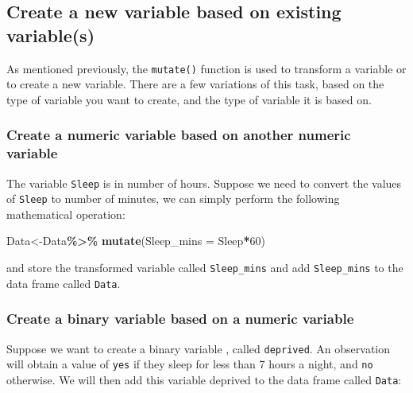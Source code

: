 \documentclass[
]{book}
\newenvironment{Shaded}{\begin{snugshade}}{\end{snugshade}}
\newcommand{\AttributeTok}[1]{\textcolor[rgb]{0.13,0.29,0.53}{#1}}
\newcommand{\DecValTok}[1]{\textcolor[rgb]{0.00,0.00,0.81}{#1}}
\newcommand{\FunctionTok}[1]{\textcolor[rgb]{0.13,0.29,0.53}{\textbf{#1}}}
\newcommand{\NormalTok}[1]{#1}
\newcommand{\OtherTok}[1]{\textcolor[rgb]{0.56,0.35,0.01}{#1}}
\newcommand{\SpecialCharTok}[1]{\textcolor[rgb]{0.81,0.36,0.00}{\textbf{#1}}}
\begin{document}
\hypertarget{create-a-new-variable-based-on-existing-variables-1}{%
\subsection{Create a new variable based on existing variable(s)}\label{create-a-new-variable-based-on-existing-variables-1}}

As mentioned previously, the \texttt{mutate()} function is used to transform a variable or to create a new variable. There are a few variations of this task, based on the type of variable you want to create, and the type of variable it is based on.

\hypertarget{create-a-numeric-variable-based-on-another-numeric-variable-1}{%
\subsubsection{Create a numeric variable based on another numeric variable}\label{create-a-numeric-variable-based-on-another-numeric-variable-1}}

The variable \texttt{Sleep} is in number of hours. Suppose we need to convert the values of \texttt{Sleep} to number of minutes, we can simply perform the following mathematical operation:

\begin{Shaded}
\begin{Highlighting}[]
\NormalTok{Data}\OtherTok{\textless{}{-}}\NormalTok{Data}\SpecialCharTok{\%\textgreater{}\%}
  \FunctionTok{mutate}\NormalTok{(}\AttributeTok{Sleep\_mins =}\NormalTok{ Sleep}\SpecialCharTok{*}\DecValTok{60}\NormalTok{)}
\end{Highlighting}
\end{Shaded}

and store the transformed variable called \texttt{Sleep\_mins} and add \texttt{Sleep\_mins} to the data frame called \texttt{Data}.

\hypertarget{create-a-binary-variable-based-on-a-numeric-variable-1}{%
\subsubsection{Create a binary variable based on a numeric variable}\label{create-a-binary-variable-based-on-a-numeric-variable-1}}

Suppose we want to create a binary variable , called \texttt{deprived}. An observation will obtain a value of \texttt{yes} if they sleep for less than 7 hours a night, and \texttt{no} otherwise. We will then add this variable deprived to the data frame called \texttt{Data}:
\end{document}
